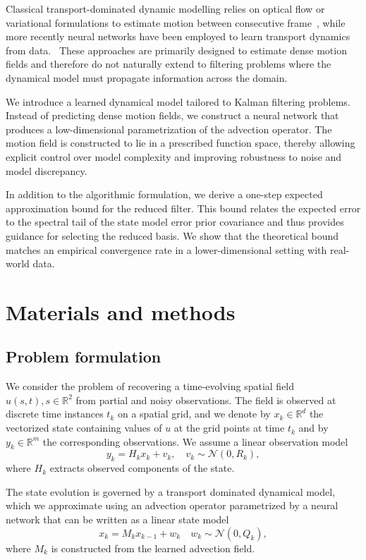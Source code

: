 \documentclass[a4paper,12pt]{article}
\begin{document}
Classical transport-dominated dynamic modelling relies on optical flow or variational formulations to estimate motion between consecutive frame~\cite{horn,lukaskanade,tvl1}, while more recently neural networks have been employed to learn transport dynamics from data.~\cite{flownet,pwcnet,raft}
These approaches are primarily designed to estimate dense motion fields and therefore do not naturally extend to filtering problems where the dynamical model must propagate information across the domain.

We introduce a learned dynamical model tailored to Kalman filtering problems.
Instead of predicting dense motion fields, we construct a neural network that produces a low-dimensional parametrization of the advection operator.
The motion field is constructed to lie in a prescribed function space, thereby allowing explicit control over model complexity and improving robustness to noise and model discrepancy.

In addition to the algorithmic formulation, we derive a one-step expected approximation bound for the reduced filter.
This bound relates the expected error to the spectral tail of the state model error prior covariance and thus provides guidance for selecting the reduced basis.
We show that the theoretical bound matches an empirical convergence rate in a lower-dimensional setting with real-world data.
\section{Materials and methods}
\subsection{Problem formulation}
We consider the problem of recovering a time-evolving spatial field $u(s, t), s \in \mathbb{R}^2$ from partial and noisy observations.
The field is observed at discrete time instances $t_k$ on a spatial grid, and we denote by $x_k \in \mathbb{R}^d$ the vectorized state containing values of $u$ at the grid points at time $t_k$ and by $y_k \in \mathbb{R}^m$ the corresponding observations.
We assume a linear observation model
\begin{equation}
    y_k = H_k x_k + v_k, \quad v_k \sim \mathcal{N}(0, R_k),
\end{equation}
where $H_k$ extracts observed components of the state.


The state evolution is governed by a transport dominated dynamical model, which we approximate using an advection operator parametrized by a neural network that can be written as a linear state model
\begin{equation}
    x_{k} = M_{k} x_{k-1} + w_{k} \quad w_k \sim \mathcal{N}(0, Q_k),
\end{equation}
where $M_k$ is constructed from the learned advection field.
\end{document}
